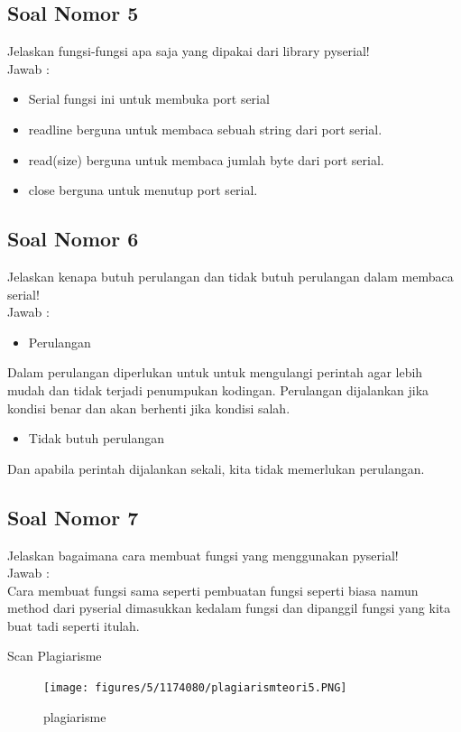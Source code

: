 \subsection{Soal Nomor 5}
Jelaskan fungsi-fungsi apa saja yang dipakai dari library pyserial!\\
Jawab :\\
\begin{itemize}
\item Serial fungsi ini untuk membuka port serial
\item readline berguna untuk membaca sebuah string dari port serial.
\item read(size) berguna untuk membaca jumlah byte dari port serial.
\item close berguna untuk menutup port serial.
\end{itemize}

\subsection{Soal Nomor 6}
Jelaskan kenapa butuh perulangan dan tidak butuh perulangan dalam membaca serial!\\
Jawab :\\
\begin{itemize}
\item Perulangan
\end{itemize}
Dalam perulangan diperlukan untuk untuk mengulangi perintah agar lebih mudah dan tidak terjadi penumpukan kodingan. Perulangan dijalankan jika kondisi benar dan akan berhenti jika kondisi salah.

\begin{itemize}
\item Tidak butuh perulangan
\end{itemize}
Dan apabila perintah dijalankan sekali, kita tidak memerlukan perulangan.

\subsection{Soal Nomor 7}
Jelaskan bagaimana cara membuat fungsi yang menggunakan pyserial!\\
Jawab :\\
Cara membuat fungsi sama seperti pembuatan fungsi seperti biasa namun method dari pyserial dimasukkan kedalam fungsi dan dipanggil fungsi yang kita buat tadi seperti itulah.

\par Scan Plagiarisme
\begin{figure}[ht!]
\texttt{[image: figures/5/1174080/plagiarismteori5.PNG]}
\centering
\caption{plagiarisme}
\end{figure}
